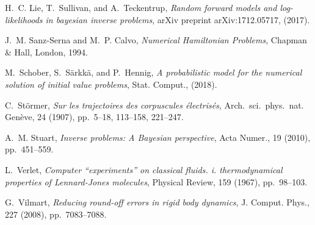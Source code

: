 \documentclass{siamart1116}
\numberwithin{theorem}{section}
\begin{document}
\begin{thebibliography}{10}
	{\sc H.~C. Lie, T.~Sullivan, and A.~Teckentrup}, {\em Random forward models and
		log-likelihoods in bayesian inverse problems}, arXiv preprint
	arXiv:1712.05717,  (2017).
	
	{\sc J.~M. Sanz-Serna and M.~P. Calvo}, {\em Numerical {H}amiltonian
		{P}roblems}, Chapman \& Hall, London, 1994.
	
	{\sc M.~Schober, S.~S{\"a}rkk{\"a}, and P.~Hennig}, {\em A probabilistic model
		for the numerical solution of initial value problems}, Stat. Comput.,
	(2018).
	
	{\sc C.~St\"ormer}, {\em Sur les trajectoires des corpuscules \'electris\'es},
	Arch.\ sci.\ phys.\ nat. Gen\`eve, 24 (1907), pp.~5--18, 113--158, 221--247.
	
	{\sc A.~M. Stuart}, {\em Inverse problems: A {B}ayesian perspective}, Acta
	Numer., 19 (2010), pp.~451--559.
	
	{\sc L.~Verlet}, {\em Computer ``experiments'' on classical fluids. i.
		thermodynamical properties of {L}ennard-{J}ones molecules}, Physical Review,
	159 (1967), pp.~98--103.
	
	{\sc G.~Vilmart}, {\em Reducing round-off errors in rigid body dynamics}, J.
	Comput. Phys., 227 (2008), pp.~7083--7088.
	
\end{thebibliography}
\end{document}
